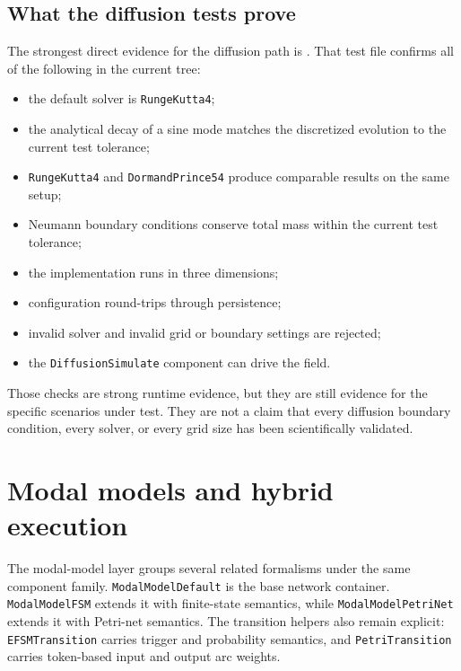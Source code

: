 \subsection{What the diffusion tests prove}
\label{subsec:diffusion-tests}

The strongest direct evidence for the diffusion path is
. That test file
confirms all of the following in the current tree:
\begin{itemize}
\item the default solver is \texttt{RungeKutta4};
\item the analytical decay of a sine mode matches the discretized evolution to
  the current test tolerance;
\item \texttt{RungeKutta4} and \texttt{DormandPrince54} produce comparable
  results on the same setup;
\item Neumann boundary conditions conserve total mass within the current test
  tolerance;
\item the implementation runs in three dimensions;
\item configuration round-trips through persistence;
\item invalid solver and invalid grid or boundary settings are rejected;
\item the \texttt{DiffusionSimulate} component can drive the field.
\end{itemize}

Those checks are strong runtime evidence, but they are still evidence for the
specific scenarios under test. They are not a claim that every diffusion
boundary condition, every solver, or every grid size has been scientifically
validated.

\section{Modal models and hybrid execution}
\label{sec:modal-and-hybrid-execution}

The modal-model layer groups several related formalisms under the same
component family. \texttt{ModalModelDefault} is the base network container.
\texttt{ModalModelFSM} extends it with finite-state semantics, while
\texttt{ModalModelPetriNet} extends it with Petri-net semantics. The transition
helpers also remain explicit: \texttt{EFSMTransition} carries trigger and
probability semantics, and \texttt{PetriTransition} carries token-based input
and output arc weights.

